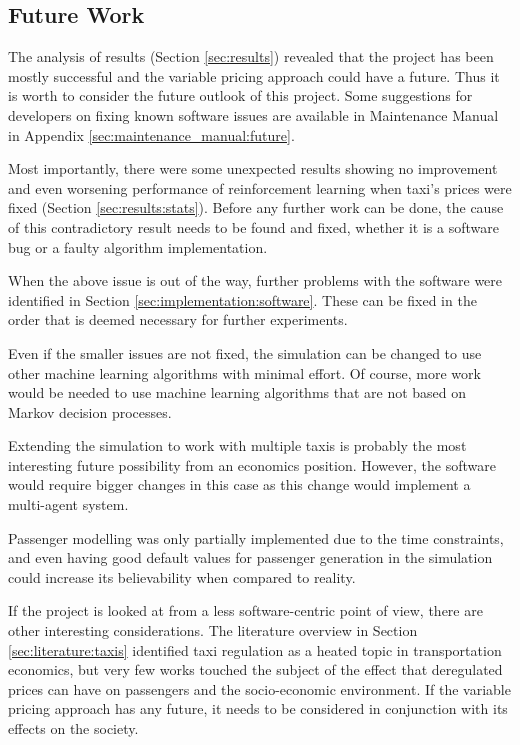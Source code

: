\subsection{Future Work}

The analysis of results (Section \ref{sec:results}) revealed that the project
has been mostly successful and the variable pricing approach could have a
future. Thus it is worth to consider the future outlook of this project. Some
suggestions for developers on fixing known software issues are available in
Maintenance Manual in Appendix \ref{sec:maintenance_manual:future}.

Most importantly, there were some unexpected results showing no improvement and
even worsening performance of reinforcement learning when taxi's prices were
fixed (Section \ref{sec:results:stats}). Before any further work can be done,
the cause of this contradictory result needs to be found and fixed, whether it
is a software bug or a faulty algorithm implementation.

When the above issue is out of the way, further problems with the software were
identified in Section \ref{sec:implementation:software}. These can be fixed in
the order that is deemed necessary for further experiments. 

Even if the smaller issues are not fixed, the simulation can be changed to use
other machine learning algorithms with minimal effort. Of course, more work
would be needed to use machine learning algorithms that are not based on Markov
decision processes.

Extending the simulation to work with multiple taxis is probably the most
interesting future possibility from an economics position. However, the
software would require bigger changes in this case as this change would
implement a multi-agent system.

Passenger modelling was only partially implemented due to the time constraints,
and even having good default values for passenger generation in the simulation
could increase its believability when compared to reality.

If the project is looked at from a less software-centric point of view, there
are other interesting considerations. The literature overview in Section
\ref{sec:literature:taxis} identified taxi regulation as a heated topic in
transportation economics, but very few works touched the subject of the effect
that deregulated prices can have on passengers and the socio-economic
environment. If the variable pricing approach has any future, it needs to be
considered in conjunction with its effects on the society.
